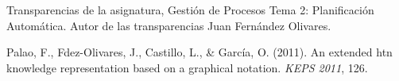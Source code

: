 % 

\begin{thebibliography}{99}

\emph{}Transparencias de la asignatura, Gesti\'on de Procesos Tema 2: Planificaci\'on Autom\'atica. Autor de las transparencias Juan Fern\'andez Olivares.

\emph{}Palao, F., Fdez-Olivares, J., Castillo, L., \& Garc\'ia, O. (2011). An extended htn knowledge representation based on a graphical notation. \textit{KEPS 2011}, 126.

\end{thebibliography}
